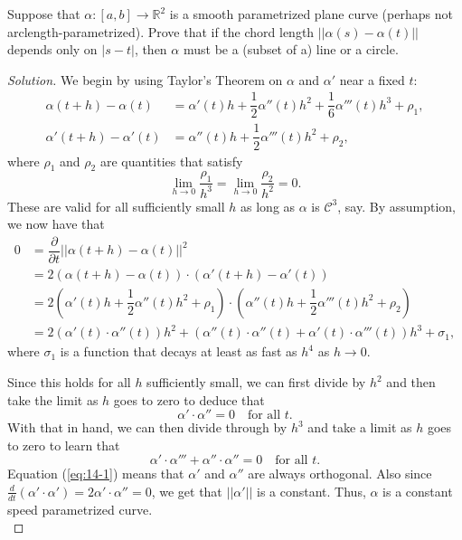 \documentclass[Shifrin_Solutions_Spring_2018]{subfiles}
\begin{document}
\clearpage

\begin{exercise}
Suppose that $\alpha:[a,b]\rightarrow \mathbb{R}^2$ is a smooth parametrized plane curve 
(perhaps not arclength-parametrized). Prove that if the chord length 
$||\alpha(s) - \alpha(t) ||$ depends only on $|s-t|$, then $\alpha$ must be a (subset of a) 
line or a circle.
\end{exercise}

\begin{proof}[Solution] We begin by using Taylor's Theorem on $\alpha$ 
and $\alpha'$ near a fixed $t$:
\begin{align*}
\alpha(t+h) - \alpha(t) & = \alpha'(t) h + \dfrac{1}{2}\alpha''(t) h^2 + 
 \dfrac{1}{6}\alpha'''(t) h^3  +  \rho_1,  \\
\alpha'(t+h) - \alpha'(t) & = \alpha''(t) h + \dfrac{1}{2}\alpha'''(t) h^2 + \rho_2,
\end{align*}
where $\rho_1$ and $\rho_2$ are quantities that satisfy
\[
\lim_{h\rightarrow 0} \dfrac{\rho_1}{h^3} = \lim_{h\rightarrow 0} \dfrac{\rho_2}{h^2} = 0.
\]
These are valid for all sufficiently small $h$ as long as $\alpha$ is $\mathcal{C}^3$, say.
By assumption, we now have that
\[
\begin{split}
0  & = \dfrac{\partial}{\partial t}\left|\left| \alpha(t+h) -\alpha(t) \right|\right|^2 \\
	& = 2\left( \alpha(t+h) - \alpha(t) \right) \cdot \left( \alpha'(t+h) - \alpha'(t) \right) \\
	& = 2\left( \alpha'(t) h + \dfrac{1}{2}\alpha''(t) h^2 + \rho_1 \right) 
	\cdot \left( \alpha''(t) h + \dfrac{1}{2}\alpha'''(t) h^2 + \rho_2 \right) \\
	& = 2(\alpha'(t)\cdot \alpha''(t) ) h^2 + ( \alpha''(t)\cdot \alpha''(t) + \alpha'(t) 
	\cdot \alpha'''(t) ) h^3 + \sigma_1,
\end{split}
\]
where $\sigma_1$ is a function that decays at least as fast as $h^4$ as $h\rightarrow 0$.

Since this holds for all $h$ sufficiently small, we can first divide by $h^2$ and then take
the limit as $h$ goes to zero to
deduce that 
\begin{equation}\label{eq:14-1}
\alpha' \cdot \alpha'' = 0  \quad \text{for all $t$}. 
\end{equation} 
With that in hand, we can then divide through by $h^3$ and take a limit as $h$ goes to zero
to learn that 
\begin{equation}\label{eq:14-2}
\alpha'\cdot \alpha''' +\alpha'' \cdot \alpha''=0 \quad \text{for all $t$}.
\end{equation}
Equation (\ref{eq:14-1}) means that $\alpha'$ and $\alpha''$ are always orthogonal. 
Also since $\frac{d}{dt}(\alpha'\cdot\alpha') = 2\alpha'\cdot\alpha''=0$, 
we get that $||\alpha'||$ is a constant. Thus, $\alpha$ is a constant speed 
parametrized curve.\\


\end{proof}
\end{document}
